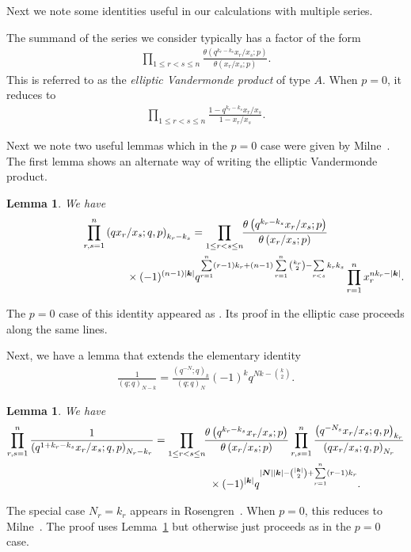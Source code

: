 \documentclass[pdftex]{sigma}
\numberwithin{equation}{section}
\newtheorem{Lemma}[Theorem]{Lemma}
\newcommand{\suml}{\sum\limits}
\newcommand{\sumN}{{\left| \boldsymbol{N} \right|}}
\newcommand\sumk{{\left| \boldsymbol{k} \right|}}
\newcommand{\sumbinomial}[2]{\suml_{r=1}^{#2} \binom{#1_r}2}
\newcommand{\qrfac}[2]{{\left({#1}; q\right)_{#2}}} %
\newcommand{\triprod}[1]{\prod\limits_{1\le r < s \le #1}}
\newcommand{\sqprod}[1]{\prod\limits_{r, s =1}^{#1}} %
\newcommand{\smallprod}[1]{\prod\limits_{r =1}^{#1}} %
\newcommand{\xover}[1]{#1_{r}/#1_{s}}
\newcommand{\vandermonde}[3]{\triprod{#3} %
 \frac{1-q^{#2_r-#2_s} \xover {#1} }{1-\xover{#1}}
}
\newcommand{\ellipticqrfac}[2]{{\left({#1}; q, p\right)_{#2}}} %
\newcommand{\elliptictheta}[1]{\theta \left({#1} ; p\right) }
\newcommand{\ellipticvandermonde}[3]{\triprod{#3} %
\!\! \frac{\elliptictheta{q^{#2_r-#2_s} \xover {#1} }}{\elliptictheta{\xover{#1}}}
}
\begin{document}
Next we note some identities useful in our calculations with multiple series.

The summand of the series we consider typically has a factor of the form
\begin{gather*}\ellipticvandermonde{x}{k}{n}.
\end{gather*}
This is referred to as the {\em elliptic Vandermonde product} of type $A$. When $p=0$, it reduces to
\begin{gather*}\vandermonde{x}{k}{n}.
\end{gather*}

Next we note two useful lemmas which in the $p=0$ case were given by Milne~\cite{Milne1997}. The first lemma shows an alternate way of writing the elliptic Vandermonde product.
\begin{Lemma}\label{th:e-magiclemma1} We have
\begin{gather*}%
\sqprod n \ellipticqrfac{q\xover x }{k_r-k_s} = \ellipticvandermonde{x}{k}{n}\\
\hphantom{\sqprod n \ellipticqrfac{q\xover x }{k_r-k_s} =}{} \times
(-1)^{(n-1)\sumk}
q^{\sum\limits_{r=1}^n (r-1)k_r+ (n-1)\sumbinomial{k}{n} -\sum\limits_{r<s}k_rk_s } \smallprod{n} x_r^{nk_r-\sumk} .
\end{gather*}
\end{Lemma}

The $p=0$ case of this identity appeared as \cite[Lemma~3.12]{Milne1997}. Its proof in the elliptic case proceeds along the same lines.

Next, we have a lemma that extends the elementary identity \cite[equation~(I.12)]{GR90}
\begin{gather*}\label{GRI.12}
\frac{1}{\qrfac{q}{N-k}} = \frac{\qrfac{q^{-N}}{k} }{\qrfac{q}{N}} (-1)^k q^{Nk-\binom k2}.
\end{gather*}
\begin{Lemma}\label{th:e-magiclemma2} We have
\begin{gather*}%
\sqprod n \frac{1}{\ellipticqrfac{q^{1+k_r-k_s}\xover x }{N_r-k_r}} =
\ellipticvandermonde{x}{k}{n}
\sqprod n \frac{\ellipticqrfac{q^{-N_s}\xover{x}}{k_r} }{\ellipticqrfac{q\xover{x}}{N_r} } \\
\hphantom{\sqprod n \frac{1}{\ellipticqrfac{q^{1+k_r-k_s}\xover x }{N_r-k_r}} =}{} \times (-1)^{\sumk} q^{\sumN\sumk-\binom{\sumk}2+\sum\limits_{r=1}^n (r-1)k_r}.
\end{gather*}
\end{Lemma}
The special case $N_r=k_r$ appears in Rosengren~\cite[equation~(3.8)]{HR2004}. When $p=0$, this reduces to Milne~\cite[Lemma~4.3]{Milne1997}. The proof uses Lemma~\ref{th:e-magiclemma1} but otherwise just proceeds as in the $p=0$ case.
\end{document}
